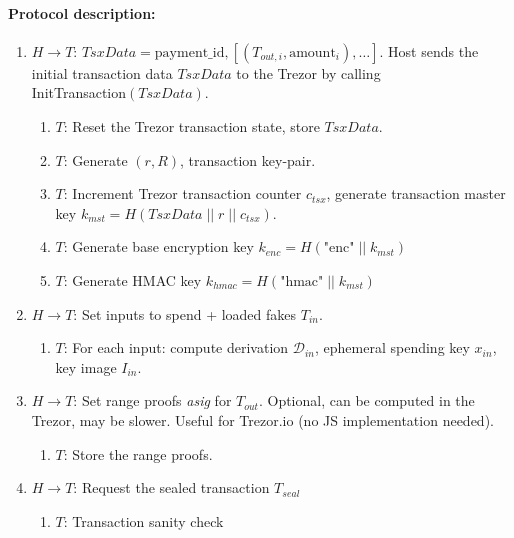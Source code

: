 \documentclass[]{article}
\begin{document}
\paragraph{Protocol description:}
\begin{enumerate}
	\item $H \rightarrow T$: $TsxData = \text{payment\_id}, \left[\left(T_{out,i}, \text{amount}_i \right), \dots \right]$. Host sends the initial transaction data $TsxData$ to the Trezor by calling\\ InitTransaction$\left(TsxData\right)$.
	
	\begin{enumerate}
		\item $T$: Reset the Trezor transaction state, store $TsxData$.
		
		\item $T$: Generate $(r, R)$, transaction key-pair.
		
		\item $T$: Increment Trezor transaction counter $c_{tsx}$, generate transaction master key $k_{mst} = H(TsxData \; || \; r \; || \; c_{tsx})$.
		
		\item $T$: Generate base encryption key $k_{enc} = H\left(\text{"enc"} \; || \; k_{mst}\right)$
		
		\item $T$: Generate HMAC key $k_{hmac} = H\left(\text{"hmac"} \; || \; k_{mst}\right)$
	\end{enumerate}
	
	\item $H \rightarrow T$: Set inputs to spend + loaded fakes $T_{in}$. 
	\begin{enumerate}
		\item $T$: For each input: compute derivation $\mathcal{D}_{in}$, ephemeral spending key $x_{in}$, key image $I_{in}$.
	\end{enumerate}
	
	\item $H \rightarrow T$: Set range proofs \emph{asig} for $T_{out}$. Optional, can be computed in the Trezor, may be slower. Useful for Trezor.io (no JS implementation needed).
	\begin{enumerate}
		\item $T$: Store the range proofs.
	\end{enumerate}
	
	\item $H \rightarrow T$: Request the sealed transaction $T_{seal}$
	\begin{enumerate}
		\item $T$: Transaction sanity check


\end{enumerate}
\end{enumerate}
\end{document}
